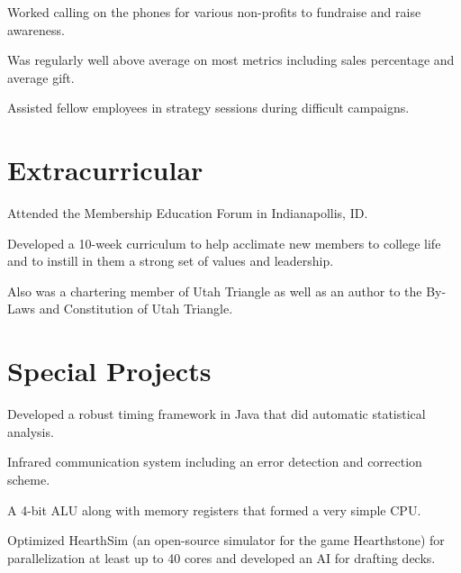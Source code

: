 \documentclass[letterpaper]{deedy-resume} %
\begin{document}
\begin{minipage}[t]{0.64\textwidth}


\begin{tightitemize}
\item Worked calling on the phones for various non-profits to fundraise and raise awareness.
\item Was regularly well above average on most metrics including sales percentage and average gift.
\item Assisted fellow employees in strategy sessions during difficult campaigns.
\end{tightitemize}

\sectionspace %


\section{Extracurricular}

\begin{tightitemize}
\item Attended the Membership Education Forum in Indianapollis, ID.
\item Developed a 10-week curriculum to help acclimate new members to college life and to instill in them a strong set of values and leadership.
\item Also was a chartering member of Utah Triangle as well as an author to the By-Laws and Constitution of Utah Triangle.
\end{tightitemize}

\sectionspace %


\section{Special Projects} 
\begin{tightitemize}
\item Developed a robust timing framework in Java that did automatic statistical analysis.
\item Infrared communication system including an error detection and correction scheme.
\item A 4-bit ALU along with memory registers that formed a very simple CPU.
\item Optimized HearthSim (an open-source simulator for the game Hearthstone) for parallelization at least up to 40 cores and developed an AI for drafting decks.
\end{tightitemize}


\end{minipage}
\end{document}

